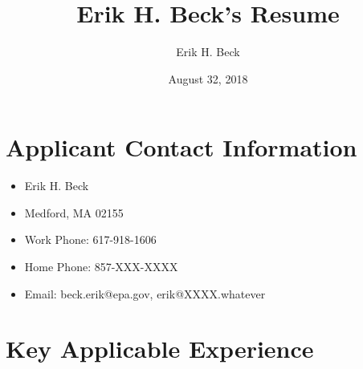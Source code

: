 \documentclass[12pt]{article}
\begin{document}
\title{Erik H. Beck's Resume}
\author{Erik H. Beck}
\date{August 32, 2018}
\maketitle

\tableofcontents

\setlength{\baselineskip}{10pt}
\section{Applicant Contact Information}

\begin{itemize}
\item
  Erik H. Beck
\item
  Medford, MA 02155
\item
  Work Phone: 617-918-1606
\item
  Home Phone: 857-XXX-XXXX
\item
  Email: beck.erik@epa.gov, erik@XXXX.whatever
\end{itemize}

\section{Key Applicable Experience}
\end{document}
